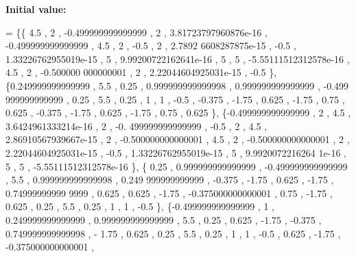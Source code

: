 {\bfseries Initial value\+:}
\begin{DoxyCode}
= \{\{              4.5 ,                 2 , -0.499999999999999 ,                 2 , 3.81723797960876e-16 ,
       -0.499999999999999 ,               4.5 ,                 2 ,              -0.5 ,                 2 , 2.7892
      6608287875e-15 ,              -0.5 , 1.33226762955019e-15 ,                 5 , 9.99200722162641e-16 ,      
                 5 ,                 5 , -5.55111512312578e-16 ,               4.5 ,                 2 , -0.500000
      000000001 ,                 2 , 2.22044604925031e-15 ,              -0.5 \},
\{0.249999999999999 ,               5.5 ,              0.25 , 0.999999999999998 , 0.999999999999999 , -0.499
      999999999999 ,              0.25 ,               5.5 ,              0.25 ,                 1 ,              
         1 ,              -0.5 ,            -0.375 ,             -1.75 ,             0.625 ,             -1.75 ,  
                  0.75 ,             0.625 ,            -0.375 ,             -1.75 ,             0.625 ,          
         -1.75 ,              0.75 ,             0.625 \},
\{-0.499999999999999 ,                 2 ,               4.5 , 3.6424961333214e-16 ,                 2 , -0.
      499999999999999 ,              -0.5 ,                 2 ,               4.5 , 2.86910567939667e-15 ,        
               2 , -0.500000000000001 ,               4.5 ,                 2 , -0.500000000000001 ,              
         2 , 2.22044604925031e-15 ,              -0.5 , 1.33226762955019e-15 ,                 5 , 9.9920072216264
      1e-16 ,                 5 ,                 5 , -5.55111512312578e-16 \},
\{             0.25 , 0.999999999999999 , -0.499999999999999 ,               5.5 , 0.999999999999998 , 0.249
      999999999999 ,            -0.375 ,             -1.75 ,             0.625 ,             -1.75 , 0.74999999999
      9999 ,             0.625 ,             0.625 ,             -1.75 , -0.375000000000001 ,              0.75 , 
                  -1.75 ,             0.625 ,              0.25 ,               5.5 ,              0.25 ,         
              1 ,                 1 ,              -0.5 \},
\{-0.499999999999999 ,                 1 , 0.249999999999999 , 0.999999999999999 ,               5.5 ,      
              0.25 ,             0.625 ,             -1.75 ,            -0.375 , 0.749999999999998 ,             -
      1.75 ,             0.625 ,              0.25 ,               5.5 ,              0.25 ,                 1 ,  
                     1 ,              -0.5 ,             0.625 ,             -1.75 , -0.375000000000001 ,         

\end{DoxyCode}
